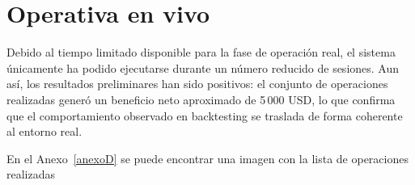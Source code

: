 


\section{Operativa en vivo}

Debido al tiempo limitado disponible para la fase de operación real, el sistema únicamente ha podido ejecutarse durante un número reducido de
sesiones. Aun así, los resultados preliminares han sido positivos: el conjunto de operaciones realizadas generó un beneficio neto aproximado de
5\,000 USD, lo que confirma que el comportamiento observado en backtesting se traslada de forma coherente al entorno real.

En el Anexo~\ref{anexoD} se puede encontrar una imagen con la lista de operaciones realizadas